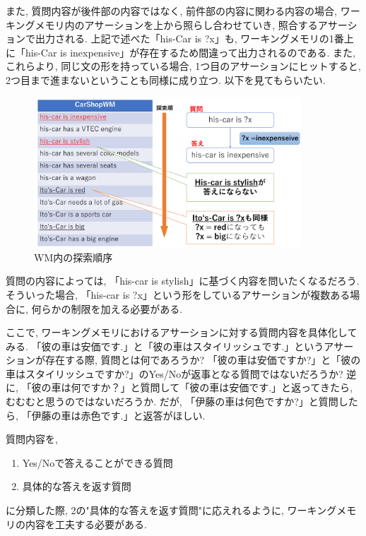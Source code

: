 \documentclass[uplatex,12pt]{jsarticle}
\begin{document}
また, 質問内容が後件部の内容ではなく, 前件部の内容に関わる内容の場合, ワーキングメモリ内のアサーションを上から照らし合わせていき, 照合するアサーションで出力される. 上記で述べた「his-Car is ?x」も, ワーキングメモリの1番上に「his-Car is inexpensive」が存在するため間違って出力されるのである. また, これらより, 同じ文の形を持っている場合, 1つ目のアサーションにヒットすると, 2つ目まで進まないということも同様に成り立つ. 以下を見てもらいたい.

\begin{figure}[htbp]
 \begin{center}
  \includegraphics[width = 10cm, pagebox = cropbox, clip]{images/後ろ向き推論_WMの探索.pdf}
 \end{center}
 \caption[]{WM内の探索順序}\label{fig:fig1.1}
\end{figure}

質問の内容によっては, 「his-car is stylish」に基づく内容を問いたくなるだろう. そういった場合, 「his-car is ?x」という形をしているアサーションが複数ある場合に, 何らかの制限を加える必要がある.

ここで, ワーキングメモリにおけるアサーションに対する質問内容を具体化してみる. 「彼の車は安価です.」と「彼の車はスタイリッシュです.」というアサーションが存在する際, 質問とは何であろうか? 「彼の車は安価ですか?」と「彼の車はスタイリッシュですか?」のYes/Noが返事となる質問ではないだろうか? 逆に, 「彼の車は何ですか？」と質問して「彼の車は安価です.」と返ってきたら, むむむと思うのではないだろうか. だが, 「伊藤の車は何色ですか?」と質問したら, 「伊藤の車は赤色です.」と返答がほしい. 

質問内容を, 
\begin{enumerate}
\item Yes/Noで答えることができる質問
\item 具体的な答えを返す質問
\end{enumerate}
に分類した際, 2の"具体的な答えを返す質問"に応えれるように, ワーキングメモリの内容を工夫する必要がある.
\end{document}

